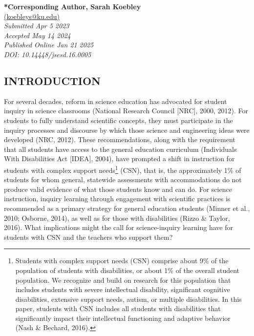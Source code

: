 \documentclass[11.5pt]{sig-alternate} %
\begin{document}
\textbf{*Corresponding Author, Sarah Koebley}\\ %
\href{mailto:koebleys@ku.edu}{(koebleys@ku.edu)} \\ %
\textit{Submitted Apr 5 2023} \\ %
\textit{Accepted May 14 2024} \\ %
\textit{Published Online Jan 21 2025} \\ %
\textit{DOI: 10.14448/jsesd.16.0005} \\ %
\pagebreak 
\clearpage %
\begin{large}
\section*{INTRODUCTION}
For several decades, reform in science education has advocated for student inquiry in science classrooms (National Research Council [NRC], 2000, 2012). For students to fully understand scientific concepts, they must participate in the inquiry processes and discourse by which those science and engineering ideas were developed (NRC, 2012). These recommendations, along with the requirement that all students have access to the general education curriculum (Individuals With Disabilities Act [IDEA], 2004), have prompted a shift in instruction for students with complex support needs\footnote{Students with complex support needs (CSN) comprise about 9\% of the population of students with disabilities, or about 1\% of the overall student population. We recognize and build on research for this population that includes students with severe intellectual disability, significant cognitive disabilities, extensive support needs, autism, or multiple disabilities. In this paper, students with CSN includes all students with disabilities that significantly impact their intellectual functioning and adaptive behavior (Nash \& Bechard, 2016).} (CSN), that is, the approximately 1\% of students for whom general, statewide assessments with accommodations do not produce valid evidence of what those students know and can do. For science instruction, inquiry learning through engagement with scientific practices is recommended as a primary strategy for general education students (Minner et al., 2010; Osborne, 2014), as well as for those with disabilities (Rizzo \& Taylor, 2016). What implications might the call for science-inquiry learning have for students with CSN and the teachers who support them?


\end{large}
\end{document}
